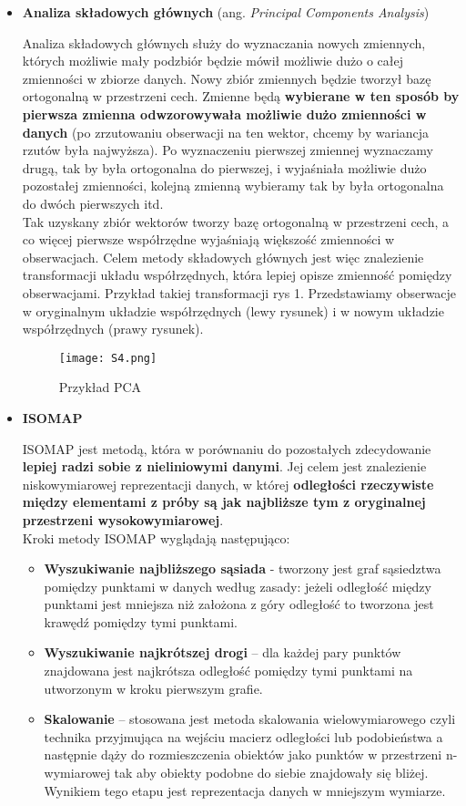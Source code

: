 \begin{itemize}
	\item \textbf{Analiza składowych głównych} (ang. \textit{Principal Components Analysis})
	
	Analiza składowych głównych służy do wyznaczania nowych zmiennych, których możliwie mały podzbiór będzie mówił możliwie dużo o całej zmienności w zbiorze danych. Nowy zbiór zmiennych będzie tworzył bazę ortogonalną w przestrzeni cech. Zmienne będą \textbf{wybierane w ten sposób by pierwsza zmienna odwzorowywała możliwie dużo zmienności w danych} (po zrzutowaniu obserwacji na ten wektor, chcemy by wariancja rzutów była najwyższa). Po wyznaczeniu pierwszej zmiennej wyznaczamy drugą, tak by była ortogonalna do pierwszej, i wyjaśniała możliwie dużo pozostałej zmienności, kolejną zmienną wybieramy tak by była ortogonalna do dwóch pierwszych itd. \\
	
	Tak uzyskany zbiór wektorów tworzy bazę ortogonalną w przestrzeni cech, a co więcej pierwsze współrzędne wyjaśniają większość zmienności w obserwacjach. Celem metody składowych głównych jest więc znalezienie transformacji układu współrzędnych, która lepiej opisze zmienność pomiędzy obserwacjami. Przykład takiej transformacji rys 1. Przedstawiamy obserwacje w oryginalnym układzie współrzędnych (lewy rysunek) i w nowym układzie współrzędnych (prawy rysunek).
	
	\begin{figure}[H]
		\centering
		\texttt{[image: S4.png]}
		\caption{Przykład PCA}
	\end{figure}

	\item \textbf{ISOMAP}
	
	ISOMAP jest metodą, która w porównaniu do pozostałych zdecydowanie \textbf{lepiej radzi sobie z nieliniowymi danymi}. Jej celem jest znalezienie niskowymiarowej reprezentacji danych, w której \textbf{odległości rzeczywiste między elementami z próby są jak najbliższe tym z oryginalnej przestrzeni wysokowymiarowej}. \\
	
	Kroki metody ISOMAP wyglądają następująco:
	\begin{itemize}
		\item \textbf{Wyszukiwanie najbliższego sąsiada} - tworzony jest graf sąsiedztwa pomiędzy punktami w danych według zasady: jeżeli odległość między punktami jest mniejsza niż założona z góry odległość to tworzona jest krawędź pomiędzy tymi punktami.
		\item \textbf{Wyszukiwanie najkrótszej drogi} – dla każdej pary punktów znajdowana jest najkrótsza odległość pomiędzy tymi punktami na utworzonym w kroku pierwszym grafie.
		\item \textbf{Skalowanie} – stosowana jest metoda skalowania wielowymiarowego czyli technika przyjmująca na wejściu macierz odległości lub podobieństwa a następnie dąży do rozmieszczenia obiektów jako punktów w przestrzeni n-wymiarowej tak aby obiekty podobne do siebie znajdowały się bliżej.  Wynikiem tego etapu jest reprezentacja danych w mniejszym wymiarze. \\
	\end{itemize}


\end{itemize}
